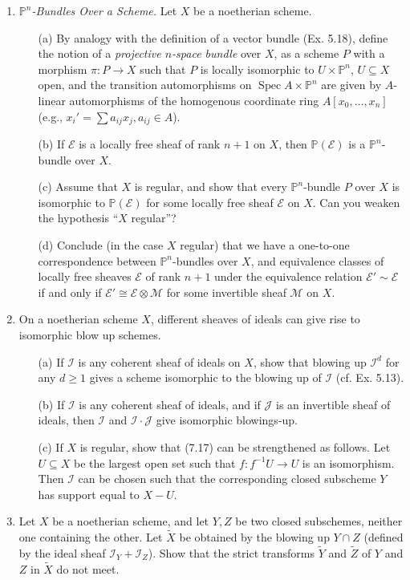 \documentclass{article}
\newcommand{\fE}{\mathcal{E}}
\newcommand{\fM}{\mathcal{M}}
\newcommand{\fI}{\mathcal{I}}
\newcommand{\fJ}{\mathcal{J}}
\newcommand{\PP}{\mathbb{P}}
\DeclareMathOperator{\spec}{Spec}
\begin{document}
\begin{enumerate} [label=\textbf{\arabic*.}, leftmargin=-0em]
\item \textit{$\PP^n$-Bundles Over a Scheme.} Let $X$ be a noetherian scheme.
\begin{itemize}
    \item[(a)] By analogy with the definition of a vector bundle (Ex. 5.18), define the notion of a \textit{projective $n$-space bundle} over $X$, as a scheme $P$ with a morphism $\pi : P \to X$ such that $P$ is locally isomorphic to $U \times \PP^n$, $U \subseteq X$ open, and the transition automorphisms on $\spec{A} \times \PP^n$ are given by $A$-linear automorphisms of the homogenous coordinate ring $A[x_0, \dots, x_n]$ (e.g., $x_i' = \sum a_{ij} x_j, a_{ij} \in A$).
    \item[(b)] If $\fE$ is a locally free sheaf of rank $n + 1$ on $X$, then $\PP(\fE)$ is a $\PP^n$-bundle over $X$.
    \item[(c)] Assume that $X$ is regular, and show that every $\PP^n$-bundle $P$ over $X$ is isomorphic to $\PP(\fE)$ for some locally free sheaf $\fE$ on $X$. Can you weaken the hypothesis ``$X$ regular''?
    \item[(d)] Conclude (in the case $X$ regular) that we have a one-to-one correspondence between $\PP^n$-bundles over $X$, and equivalence classes of locally free sheaves $\fE$ of rank $n + 1$ under the equivalence relation $\fE' \sim \fE$ if and only if $\fE' \cong \fE \otimes \fM$ for some invertible sheaf $\fM$ on $X$.
\end{itemize}

\item On a noetherian scheme $X$, different sheaves of ideals can give rise to isomorphic blow up schemes.
\begin{itemize}
    \item[(a)] If $\fI$ is any coherent sheaf of ideals on $X$, show that blowing up $\fI^d$ for any $d \geq 1$ gives a scheme isomorphic to the blowing up of $\fI$ (cf. Ex. 5.13).
    \item[(b)] If $\fI$ is any coherent sheaf of ideals, and if $\fJ$ is an invertible sheaf of ideals, then $\fI$ and $\fI \cdot \fJ$ give isomorphic blowings-up.
    \item[(c)] If $X$ is regular, show that (7.17) can be strengthened as follows. Let $U \subseteq X$ be the largest open set such that $f : f^{-1}U \to U$ is an isomorphism. Then $\fI$ can be chosen such that the corresponding closed subscheme $Y$ has support equal to $X - U$.
\end{itemize}

\item Let $X$ be a noetherian scheme, and let $Y, Z$ be two closed subschemes, neither one containing the other. Let $\tilde{X}$ be obtained by the blowing up $Y \cap Z$ (defined by the ideal sheaf $\fI_Y + \fI_Z$). Show that the strict transforms $\tilde{Y}$ and $\tilde{Z}$ of $Y$ and $Z$ in $\tilde{X}$ do not meet.


\end{enumerate}
\end{document}
